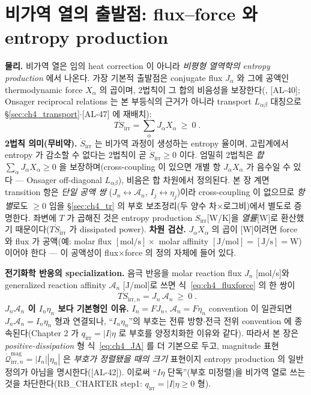 \documentclass[11pt,a4paper]{article}
\newcommand{\irr}{\mathrm{irr}}
\newcommand{\AL}[1]{\textsf{[AL-#1]}}
\begin{document}
\section{비가역 열의 출발점: flux--force 와 entropy production}\label{sec:ch4_irr}
\textbf{물리.} 비가역 열은 임의 heat correction 이 아니라 \emph{비평형 열역학의 entropy production} 에서 나온다.
가장 기본적 출발점은 conjugate flux $J_\alpha$ 와 그에 공액인 thermodynamic force $X_\alpha$ 의 곱이며, 2법칙이
그 합의 비음성을 보장한다(\cite{degrootmazur1962,prigogine1967}, \AL{40}; Onsager reciprocal relations 는 본
부등식의 근거가 아니라 transport $L_{\alpha\beta}$ 대칭으로 \S\ref{sec:ch4_transport}$\cdot$\AL{47} 에 재배치):
\begin{equation}
\boxed{\;T\dot S_{\irr}=\sum_\alpha J_\alpha X_\alpha\ \ge\ 0\;.}
\label{eq:ch4_fluxforce}
\end{equation}
\textbf{2법칙 의미(무비약).} $\dot S_\irr$ 는 비가역 과정이 생성하는 entropy 율이며, 고립계에서 entropy 가
감소할 수 없다는 2법칙이 곧 $\dot S_\irr\ge0$ 이다. 엄밀히 2법칙은 \emph{합} $\sum_\alpha J_\alpha X_\alpha\ge0$
을 보장하며(cross-coupling 이 있으면 개별 항 $J_\alpha X_\alpha$ 가 음수일 수 있다 — Onsager off-diagonal
$L_{\alpha\beta}$), 비음은 합 차원에서 정의된다. 본 장 계면 transition 항은 \emph{단일 공액 쌍}
($J_n\leftrightarrow\mathcal A_n$, $I_j\leftrightarrow\eta_j$)이라 cross-coupling 이 없으므로 \emph{항별}로도 $\ge0$
임을 \S\ref{sec:ch4_tr} 의 부호 보조정리(두 양수 차$\times$로그비)에서 별도로 증명한다. 좌변에 $T$ 가 곱해진
것은 entropy production $\dot S_\irr$[W/K]을 \emph{열률}[W]로 환산했기 때문이다($T\dot S_\irr$ 가 dissipated
power). \textbf{차원 검산.} $J_\alpha X_\alpha$ 의 곱이 [W]이려면 force 와 flux 가 공액(예: molar flux
$[\mathrm{mol/s}]\times$ molar affinity $[\mathrm{J/mol}]=[\mathrm{J/s}]=\mathrm W$)이어야 한다 — 이 공액성이
flux$\times$force 의 정의 자체에 들어 있다.

\textbf{전기화학 반응의 specialization.} 음극 반응을 molar reaction flux $J_n$ [mol/s]와 generalized reaction
affinity $\mathcal A_n$ [J/mol]로 쓰면 식~\eqref{eq:ch4_fluxforce} 의 한 쌍이
\begin{equation}
\boxed{\;T\dot S_{\irr,n}=J_n\,\mathcal A_n\ \ge\ 0\;.}
\label{eq:ch4_JA}
\end{equation}
\textbf{$J_n\mathcal A_n$ 이 $I_n\eta_n$ 보다 기본형인 이유.} $I_n=FJ_n$, $\mathcal A_n=F\eta_n$ convention 이
일관되면 $J_n\mathcal A_n=I_n\eta_n$ 형과 연결되나, ``$I_n\eta_n$''의 부호는 전류 방향$\cdot$전극 전위
convention 에 종속된다(Chapter 2 가 $q_\irr=|I|\eta$ 로 부호를 양정치화한 이유와 같다). 따라서 본 장은
\emph{positive-dissipation} 형 식~\eqref{eq:ch4_JA} 를 더 기본으로 두고, magnitude 표현
$\dot{\mathcal Q}_{\irr,n}^{\mathrm{mag}}=|I_n||\eta_n|$ 은 \emph{부호가 정렬됐을 때의 크기} 표현이지 entropy
production 의 일반 정의가 아님을 명시한다(\AL{42}). 이로써 ``$I\eta$ 단독''(부호 미정렬)을 비가역 열로 쓰는
것을 차단한다(RB\_CHARTER step1: $q_\irr=|I|\eta\ge0$ 형).
\end{document}
